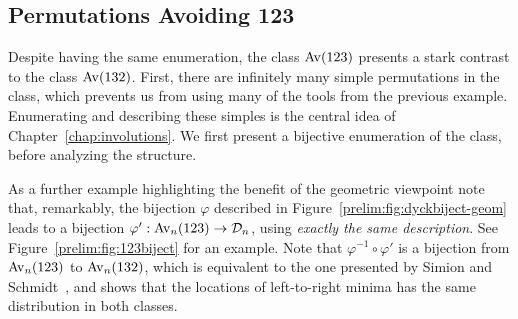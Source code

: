   \subsection{Permutations Avoiding 123}
  \label{prelim:sec:av123}

    Despite having the same enumeration, the class $\operatorname{{Av}}(123)$ presents a stark
    contrast to the class $\operatorname{{Av}} (132)$. First, there are infinitely many
    simple permutations in the class, which prevents us from using many of the
    tools from the previous example. Enumerating and describing these simples
    is the central idea of Chapter~\ref{chap:involutions}. We first present a
    bijective enumeration of the class, before analyzing the structure. 
    
    As a further example highlighting the benefit of the geometric viewpoint
    note that, remarkably, the bijection $\varphi$ described in
    Figure~\ref{prelim:fig:dyckbiject-geom} leads to a bijection
    $\varphi':\operatorname{{Av}}_n(123) \rightarrow \mathcal{D}_n$, using \emph{exactly the same description}.
    See Figure~\ref{prelim:fig:123biject} for an example. Note that
    $\varphi^{-1}
    \circ \varphi'$ is a bijection from $\operatorname{{Av}}_n (123)$ to $\operatorname{{Av}}_n (132)$, which is
    equivalent to the one presented by Simion and Schmidt~\cite{Simion1985},
    and shows that the locations of left-to-right minima has the same
    distribution in both classes. 

